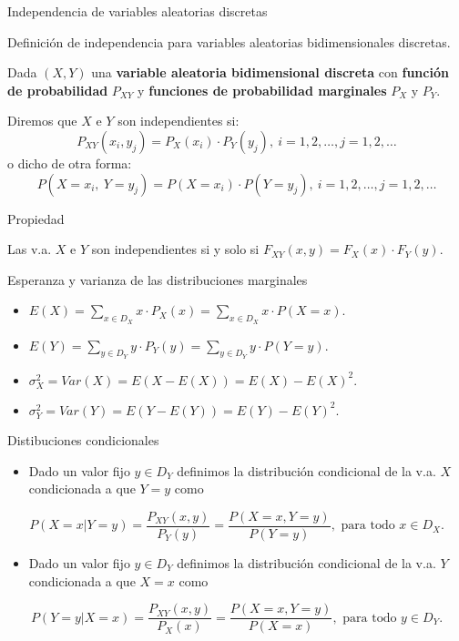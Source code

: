 \documentclass[ignorenonframetext,]{beamer}
\providecommand{\tightlist}{%
  \setlength{\itemsep}{0pt}\setlength{\parskip}{0pt}}
\begin{document}
\begin{frame}{Independencia de variables aleatorias discretas}
\protect\hypertarget{independencia-de-variables-aleatorias-discretas-1}{}

Definición de independencia para variables aleatorias bidimensionales
discretas.

Dada \((X,Y)\) una \textbf{variable aleatoria bidimensional discreta}
con \textbf{función de probabilidad} \(P_{XY}\) y \textbf{funciones de
probabilidad marginales} \(P_X\) y \(P_Y\).

Diremos que \(X\) e \(Y\) son independientes si: \[
P_{XY}(x_i,y_j)=P_X(x_i)\cdot P_Y(y_j),\ i=1,2,\ldots,j=1,2,\ldots
\] o dicho de otra forma: \[
P(X=x_i,\ Y=y_j)=P(X=x_i)\cdot P(Y=y_j),\ i=1,2,\ldots,j=1,2,\ldots
\]

 Propiedad

Las v.a. \(X\) e \(Y\) son independientes si y solo si
\(F_{XY}(x,y)=F_X(x) \cdot F_Y(y).\)

\end{frame}

\begin{frame}{Esperanza y varianza de las distribuciones marginales}
\protect\hypertarget{esperanza-y-varianza-de-las-distribuciones-marginales}{}

\begin{itemize}
\tightlist
\item
  \(E(X)=\displaystyle \sum_{x\in D_X} x\cdot P_X(x)=\sum_{x\in D_X} x\cdot P(X=x).\)
\item
  \(E(Y)=\displaystyle\sum_{y\in D_Y} y\cdot P_Y(y)=\sum_{y\in D_Y} y\cdot P(Y=y).\)
\item
  \(\sigma_X^2=Var(X)=E(X-E(X))=E(X)-E(X)^2.\)
\item
  \(\sigma_Y^2=Var(Y)=E(Y-E(Y))=E(Y)-E(Y)^2.\)
\end{itemize}

\end{frame}

\begin{frame}{Distibuciones condicionales}
\protect\hypertarget{distibuciones-condicionales}{}

\begin{itemize}
\tightlist
\item
  Dado un valor fijo \(y\in D_Y\) definimos la distribución condicional
  de la v.a. \(X\) condicionada a que \(Y=y\) como
\end{itemize}

\[P(X=x|Y=y)=\frac{P_{XY}(x,y)}{P_Y(y)}=\frac{P(X=x,Y=y)}{P(Y=y)},\mbox{  para todo } x\in D_X.\]

\begin{itemize}
\tightlist
\item
  Dado un valor fijo \(y\in D_Y\) definimos la distribución condicional
  de la v.a. \(Y\) condicionada a que \(X=x\) como
\end{itemize}

\[P(Y=y|X=x)=\frac{P_{XY}(x,y)}{P_X(x)}=\frac{P(X=x,Y=y)}{P(X=x)},\mbox{  para todo } y\in D_Y.\]

\end{frame}
\end{document}
